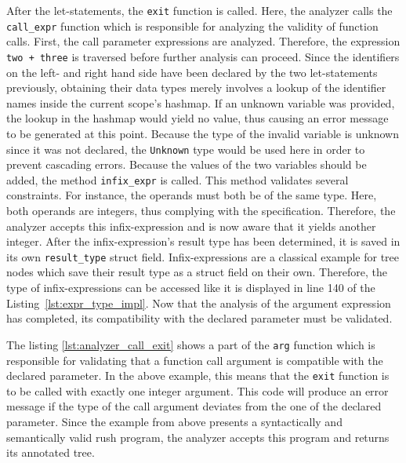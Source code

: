 After the let-statements, the \texttt{exit} function is called.
Here, the analyzer calls the \texttt{call\_expr} function which is responsible for analyzing the validity of function calls.
First, the call parameter expressions are analyzed.
Therefore, the expression \texttt{two + three} is traversed before further analysis can proceed.
Since the identifiers on the left- and right hand side have been declared by the two let-statements previously,
obtaining their data types merely involves a lookup of the identifier names inside the current scope's hashmap.
If an unknown variable was provided, the lookup in the hashmap would yield no value, thus causing an error message to be generated at this point.
Because the type of the invalid variable is unknown since it was not declared, the \texttt{Unknown} type would be used here in order to prevent cascading errors.
Because the values of the two variables should be added, the method \texttt{infix\_expr} is called.
This method validates several constraints.
For instance, the operands must both be of the same type.
Here, both operands are integers, thus complying with the specification.
Therefore, the analyzer accepts this infix-expression and is now aware that it yields another integer.
After the infix-expression's result type has been determined, it is saved in its own \texttt{result\_type} struct field.
Infix-expressions are a classical example for tree nodes which save their result type as a struct field on their own.
Therefore, the type of infix-expressions can be accessed like it is displayed in line 140 of the Listing~\ref{lst:expr_type_impl}.
Now that the analysis of the argument expression has completed, its compatibility with the declared parameter must be validated.


The listing \ref{lst:analyzer_call_exit} shows a part of the \texttt{arg} function which is responsible for validating that a function call argument is compatible with the declared parameter.
In the above example, this means that the \texttt{exit} function is to be called with exactly one integer argument.
This code will produce an error message if the type of the call argument deviates from the one of the declared parameter.
Since the example from above presents a syntactically and semantically valid rush program, the analyzer accepts this program and returns its annotated tree.

